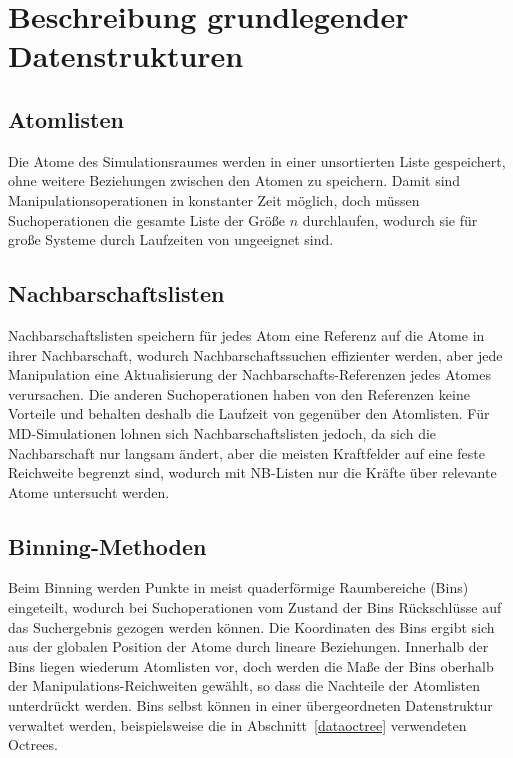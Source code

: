 \section{Beschreibung grundlegender Datenstrukturen}
\label{appendix_dataoverview}

\subsection{Atomlisten}

Die Atome des Simulationsraumes werden in einer unsortierten Liste gespeichert, ohne weitere Beziehungen zwischen den Atomen zu speichern.
Damit sind Manipulationsoperationen in konstanter Zeit  möglich, doch müssen Suchoperationen die gesamte Liste der Größe $n$ durchlaufen, wodurch sie für große Systeme durch Laufzeiten von  ungeeignet sind.

\subsection{Nachbarschaftslisten}

Nachbarschaftslisten speichern für jedes Atom eine Referenz auf die Atome in ihrer Nachbarschaft, wodurch Nachbarschaftssuchen effizienter werden, aber jede Manipulation eine Aktualisierung der Nachbarschafts-Referenzen jedes Atomes verursachen.
Die anderen Suchoperationen haben von den Referenzen keine Vorteile und behalten deshalb die Laufzeit von  gegenüber den Atomlisten.
Für MD-Simulationen lohnen sich Nachbarschaftslisten jedoch, da sich die Nachbarschaft nur langsam ändert, aber die meisten Kraftfelder auf eine feste Reichweite begrenzt sind, wodurch mit NB-Listen nur die Kräfte über relevante Atome untersucht werden.

\subsection{Binning-Methoden}
Beim Binning werden Punkte in meist quaderförmige Raumbereiche (Bins) eingeteilt, wodurch bei Suchoperationen vom Zustand der Bins Rückschlüsse auf das Suchergebnis gezogen werden können.
Die Koordinaten des Bins ergibt sich aus der globalen Position der Atome durch lineare Beziehungen.
Innerhalb der Bins liegen wiederum Atomlisten vor, doch werden die Maße der Bins oberhalb der Manipulations-Reichweiten gewählt, so dass die Nachteile der Atomlisten unterdrückt werden.
Bins selbst können in einer übergeordneten Datenstruktur verwaltet werden, beispielsweise die in Abschnitt~\ref{dataoctree} verwendeten Octrees.

